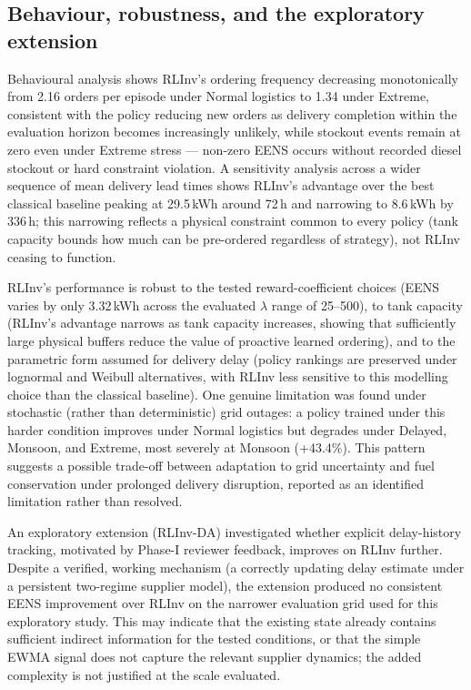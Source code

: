 \subsection{Behaviour, robustness, and the exploratory extension}

Behavioural analysis shows RLInv's ordering frequency decreasing
monotonically from 2.16 orders per episode under Normal logistics to
1.34 under Extreme, consistent with the policy reducing new orders as
delivery completion within the evaluation horizon becomes increasingly
unlikely, while stockout events remain at zero even under Extreme
stress --- non-zero EENS occurs without recorded diesel stockout or
hard constraint violation. A sensitivity analysis across a wider
sequence of mean delivery
lead times shows RLInv's advantage over the best classical baseline
peaking at 29.5\,kWh around 72\,h and narrowing to 8.6\,kWh by 336\,h;
this narrowing reflects a physical constraint common to every policy
(tank capacity bounds how much can be pre-ordered regardless of
strategy), not RLInv ceasing to function.

RLInv's performance is robust to the tested reward-coefficient choices
(EENS varies by only 3.32\,kWh across the evaluated $\lambda$ range of
25--500), to tank capacity (RLInv's advantage narrows as tank capacity
increases, showing that sufficiently large physical buffers reduce the
value of proactive learned ordering), and to the parametric form
assumed for delivery delay (policy rankings are preserved under
lognormal and Weibull alternatives, with RLInv less sensitive to this
modelling choice than the classical baseline). One genuine limitation
was found under stochastic (rather than deterministic) grid outages: a
policy trained under this harder condition improves under Normal
logistics but degrades under Delayed, Monsoon, and Extreme, most
severely at Monsoon (+43.4\%). This pattern suggests a possible
trade-off between adaptation to grid uncertainty and fuel conservation
under prolonged delivery
disruption, reported as an identified limitation rather than resolved.

An exploratory extension (RLInv-DA) investigated whether explicit
delay-history tracking, motivated by Phase-I reviewer feedback,
improves on RLInv further. Despite a verified, working mechanism (a
correctly updating delay estimate under a persistent two-regime
supplier model), the extension produced no consistent EENS improvement
over RLInv on the narrower evaluation grid used for this exploratory
study. This may indicate that the existing state already
contains sufficient indirect information for the tested conditions, or
that the simple EWMA signal does not capture the relevant supplier
dynamics; the added complexity is not justified at the scale evaluated.

